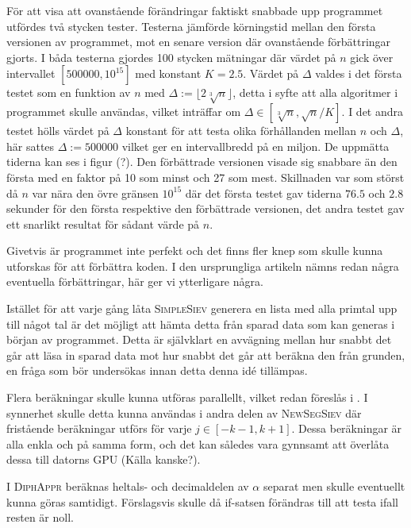 För att visa att ovanstående förändringar faktiskt snabbade upp programmet utfördes två stycken tester.
Testerna jämförde körningstid mellan den första versionen av programmet, mot en senare version där ovanstående förbättringar gjorts.
I båda testerna gjordes 100 stycken mätningar där värdet på $n$ gick över intervallet $[500000, 10^{15}]$ med konstant $K=2.5$.
Värdet på $\Delta$ valdes i det första testet som en funktion av $n$ med $\Delta := \lfloor2\sqrt[3]{n}\rfloor$,
detta i syfte att alla algoritmer i programmet skulle användas, vilket inträffar om $\Delta\in[\sqrt[3]{n},\sqrt{n}/K]$.
I det andra testet hölls värdet på $\Delta$ konstant för att testa olika förhållanden mellan $n$ och $\Delta$, här sattes $\Delta := 500000$ vilket ger en intervallbredd på en miljon. De uppmätta tiderna kan ses i figur (?). Den förbättrade versionen visade sig snabbare än den första med en faktor på 10 som minst och 27 som mest. Skillnaden var som störst då $n$ var nära den övre gränsen $10^{15}$ där det första testet gav tiderna $76.5$ och $2.8$ sekunder för den första respektive den förbättrade versionen, det andra testet gav ett snarlikt resultat för sådant värde på $n$.


Givetvis är programmet inte perfekt och det finns fler knep som skulle kunna utforskas för att förbättra koden.
I den ursprungliga artikeln \cite{HaraldSieve} nämns redan några eventuella förbättringar, här ger vi ytterligare några.
\begin{myitemize}
    \item Istället för att varje gång låta \textsc{SimpleSiev} generera en lista med alla primtal upp till något tal är det möjligt att hämta detta från sparad data som kan generas i början av programmet.
    Detta är självklart en avvägning mellan hur snabbt det går att läsa in sparad data mot hur snabbt det går att beräkna den från grunden, en fråga som bör undersökas innan detta denna idé tillämpas.
    \item Flera beräkningar skulle kunna utföras parallellt, vilket redan föreslås i \cite{HaraldSieve}. 
    I synnerhet skulle detta kunna användas i andra delen av \textsc{NewSegSiev} där fristående beräkningar utförs för varje $j\in[-k-1,k+1]$.
    Dessa beräkningar är alla enkla och på samma form, och det kan således vara gynnsamt att överlåta dessa till datorns GPU (Källa kanske?).
    \item I \textsc{DiphAppr} beräknas heltals- och decimaldelen av $\alpha$ separat men skulle eventuellt kunna göras samtidigt. Förslagsvis skulle då if-satsen förändras till att testa ifall resten är noll.
\end{myitemize}
